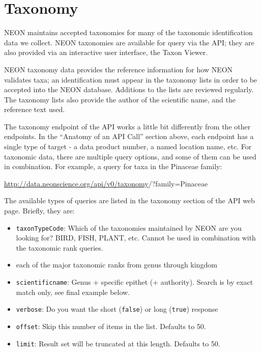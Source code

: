 \documentclass[]{book}
\providecommand{\tightlist}{%
  \setlength{\itemsep}{0pt}\setlength{\parskip}{0pt}}
\begin{document}
\hypertarget{taxonomy}{%
\section{Taxonomy}\label{taxonomy}}

NEON maintains accepted taxonomies for many of the taxonomic identification
data we collect. NEON taxonomies are available for query via the API; they
are also provided via an interactive user interface, the Taxon Viewer.

NEON taxonomy data provides the reference information for how NEON
validates taxa; an identification must appear in the taxonomy lists
in order to be accepted into the NEON database. Additions to the lists
are reviewed regularly. The taxonomy lists also provide the author
of the scientific name, and the reference text used.

The taxonomy endpoint of the API works a little bit differently from the
other endpoints. In the ``Anatomy of an API Call'' section above, each
endpoint has a single type of target - a data product number, a named
location name, etc. For taxonomic data, there are multiple query
options, and some of them can be used in combination.
For example, a query for taxa in the Pinaceae family:

{\url{http://data.neonscience.org/api/v0/taxonomy}}{/?family=Pinaceae}

The available types of queries are listed in the taxonomy section
of the API web page. Briefly, they are:

\begin{itemize}
\tightlist
\item
  \texttt{taxonTypeCode}: Which of the taxonomies maintained by NEON are you
  looking for? BIRD, FISH, PLANT, etc. Cannot be used in combination
  with the taxonomic rank queries.
\item
  each of the major taxonomic ranks from genus through kingdom
\item
  \texttt{scientificname}: Genus + specific epithet (+ authority). Search is
  by exact match only, see final example below.
\item
  \texttt{verbose}: Do you want the short (\texttt{false}) or long (\texttt{true}) response
\item
  \texttt{offset}: Skip this number of items in the list. Defaults to 50.
\item
  \texttt{limit}: Result set will be truncated at this length. Defaults to 50.
\end{itemize}
\end{document}
